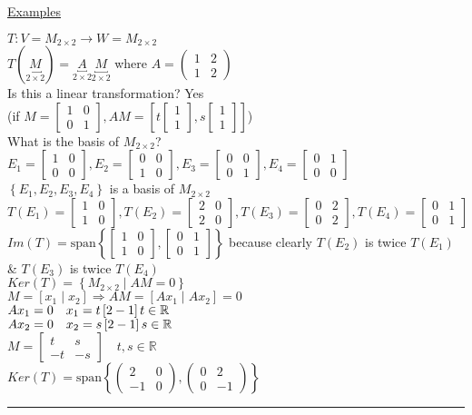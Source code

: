 \documentclass[12pt]{article}
\newcommand\m[1]{\begin{bmatrix}#1\end{bmatrix}}
\newcommand\mm[1]{\begin{pmatrix}#1\end{pmatrix}}
\newcommand{\real}[0]{\mathbb{R}}
\newcommand{\uu}[1]{\underbracket{#1}}
\newenvironment{examples}{\shownto{-,compact}\underline{Examples}\enumerate}{\endenumerate\divider\endshownto}
\newcommand{\bb}[1]{\left\{#1\right\}}
\newcommand{\bbb}[1]{\left[#1\right]}
\newcommand{\divider}[0]{\par\textcolor{lightgray}{\rule{\textwidth}{0.1pt}}}
\newcommand{\sspan}[1]{\text{span}\bb{#1}}
\begin{document}
\begin{examples}
	\item $T: V = M_{2 \times 2} \rightarrow W = M_{2 \times 2}$ \\
	$T(\uu{M}_{2 \times 2}) = \uu{A}_{2 \times 2} \uu{M}_{2 \times 2}$ \quad where $A = \mm{1 & 2 \\ 1 & 2}$ \\
	Is this a linear transformation? Yes \\
	(if $M = \m{1 & 0 \\ 0 & 1}, AM = \bbb{t\m{1 \\ 1}, s\m{1 \\ 1}}$) \\
	What is the basis of $M_{2 \times 2}$? \quad $E_1 = \m{1 & 0 \\ 0 & 0}, E_2 = \m{0 & 0 \\ 1 & 0}, E_3 = \m{0 & 0 \\ 0 & 1}, E_4 = \m{0 & 1 \\ 0 & 0}$ \\
	$\bb{E_1, E_2, E_3, E_4}$ is a basis of $M_{2 \times 2}$ \\
	$T(E_1) = \m{1 & 0 \\ 1 & 0}, T(E_2) = \m{2 & 0 \\ 2 & 0}, T(E_3) = \m{0 & 2 \\ 0 & 2}, T(E_4) = \m{0 & 1 \\ 0 & 1}$ \\
	$Im(T) = \sspan{\m{1 & 0 \\ 1 & 0}, \m{0 & 1 \\ 0 & 1}}$ because clearly $T(E_2)$ is twice $T(E_1)$ \& $T(E_3)$ is twice $T(E_4)$ \\
	
	$Ker(T) = \bb{M_{2 \times 2} \mid AM = 0}$ \\
	$M = \bbb{x_1 \mid x_2} \Rightarrow AM = \bbb{Ax_1 \mid Ax_2} = 0$ \\
	$Ax_1 = 0 \quad x_1 = t \bbb{2 \\ -1} t \in \real$ \\
	$Ax_2 = 0 \quad x_2 = s \bbb{2 \\ -1} s \in \real$ \\
	
	$M = \m{t & s \\ -t & -s} \quad t, s \in \real$ \\
	
	$Ker(T) = \sspan{\mm{2 & 0 \\ -1 & 0}, \mm{0 & 2 \\ 0 & -1}}$
	
\end{examples}
\end{document}
